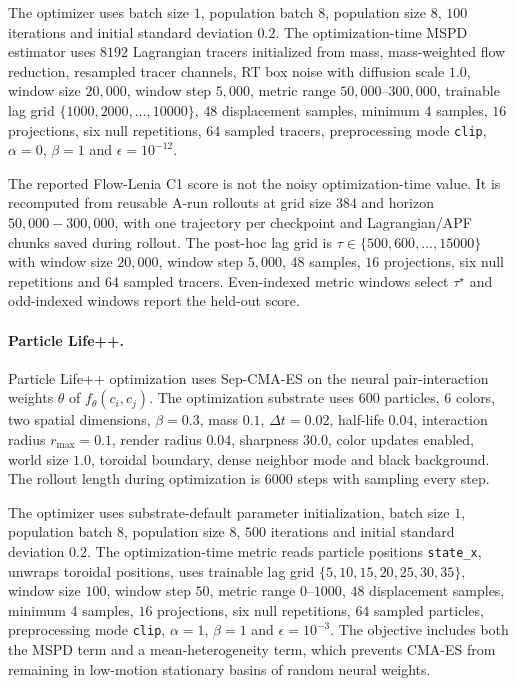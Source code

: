 The optimizer uses batch size $1$, population batch $8$, population size $8$, $100$ iterations and initial standard deviation $0.2$.  The optimization-time MSPD estimator uses $8192$ Lagrangian tracers initialized from mass, mass-weighted flow reduction, resampled tracer channels, RT box noise with diffusion scale $1.0$, window size $20{,}000$, window step $5{,}000$, metric range $50{,}000$--$300{,}000$, trainable lag grid $\{1000,2000,\ldots,10000\}$, $48$ displacement samples, minimum $4$ samples, $16$ projections, six null repetitions, $64$ sampled tracers, preprocessing mode \texttt{clip}, $\alpha=0$, $\beta=1$ and $\epsilon=10^{-12}$.

The reported Flow-Lenia C1 score is not the noisy optimization-time value.  It is recomputed from reusable A-run rollouts at grid size $384$ and horizon $50{,}000-300{,}000$, with one trajectory per checkpoint and Lagrangian/APF chunks saved during rollout.  The post-hoc lag grid is $\tau\in\{500,600,\ldots,15000\}$ with window size $20{,}000$, window step $5{,}000$, $48$ samples, $16$ projections, six null repetitions and $64$ sampled tracers.  Even-indexed metric windows select $\tau^\star$ and odd-indexed windows report the held-out score.

\paragraph{Particle Life++.}
Particle Life++ optimization uses Sep-CMA-ES on the neural pair-interaction weights $\theta$ of $f_\theta(c_i,c_j)$.  The optimization substrate uses $600$ particles, $6$ colors, two spatial dimensions, $\beta=0.3$, mass $0.1$, $\Delta t=0.02$, half-life $0.04$, interaction radius $r_{\max}=0.1$, render radius $0.04$, sharpness $30.0$, color updates enabled, world size $1.0$, toroidal boundary, dense neighbor mode and black background.  The rollout length during optimization is $6000$ steps with sampling every step.

The optimizer uses substrate-default parameter initialization, batch size $1$, population batch $8$, population size $8$, $500$ iterations and initial standard deviation $0.2$.  The optimization-time metric reads particle positions \texttt{state\_x}, unwraps toroidal positions, uses trainable lag grid $\{5,10,15,20,25,30,35\}$, window size $100$, window step $50$, metric range $0$--$1000$, $48$ displacement samples, minimum $4$ samples, $16$ projections, six null repetitions, $64$ sampled particles, preprocessing mode \texttt{clip}, $\alpha=1$, $\beta=1$ and $\epsilon=10^{-3}$.  The objective includes both the MSPD term and a mean-heterogeneity term, which prevents CMA-ES from remaining in low-motion stationary basins of random neural weights.

